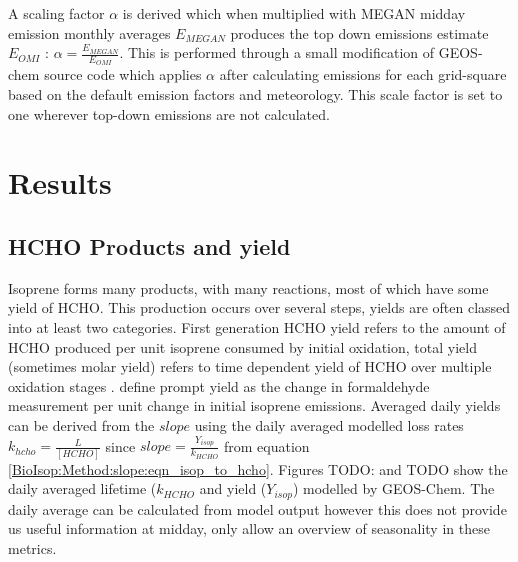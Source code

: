   A scaling factor $\alpha$ is derived which when multiplied with MEGAN midday emission monthly averages $E_{MEGAN}$ produces the top down emissions estimate $E_{OMI}$ : $\alpha = \frac{E_{MEGAN}}{E_{OMI}}$.
  This is performed through a small modification of GEOS-chem source code which applies $\alpha$ after calculating emissions for each grid-square based on the default emission factors and meteorology.
  This scale factor is set to one wherever top-down emissions are not calculated.

\section{Results}
  \label{BioIsop:Results}
  
  
  
  \subsection{HCHO Products and yield}
    \label{BioIsop:Results:HCHOYield}
    Isoprene forms many products, with many reactions, most of which have some yield of HCHO.
    This production occurs over several steps, yields are often classed into at least two categories.
    First generation HCHO yield refers to the amount of HCHO produced per unit isoprene consumed by initial oxidation, total yield (sometimes molar yield) refers to time dependent yield of HCHO over multiple oxidation stages \parencite{Wolfe2016}.
    \textcite{Wolfe2016} define prompt yield as the change in formaldehyde measurement per unit change in initial isoprene emissions.
    Averaged daily yields can be derived from the $slope$ using the daily averaged modelled loss rates $k_{hcho} = \frac{L}{[HCHO]}$ since $slope = \frac{Y_{isop}}{k_{HCHO}}$ from equation \ref{BioIsop:Method:slope:eqn_isop_to_hcho}.
    Figures TODO: and TODO show the daily averaged lifetime ($k_{HCHO}$ and yield ($Y_{isop}$) modelled by GEOS-Chem.
    The daily average can be calculated from model output however this does not provide us useful information at midday, only allow an overview of seasonality in these metrics.
    
